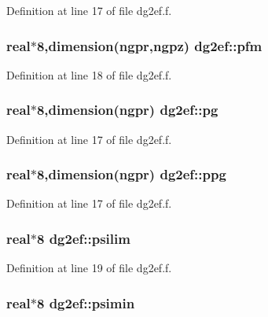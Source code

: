 Definition at line 17 of file dg2ef.f.\hypertarget{namespacedg2ef_b6b952ebcf59b377d1bca5197bf5500e}{
\subsubsection[pfm]{\setlength{\rightskip}{0pt plus 5cm}real$\ast$8,dimension(ngpr,ngpz) {\bf dg2ef::pfm}}}
\label{namespacedg2ef_b6b952ebcf59b377d1bca5197bf5500e}




Definition at line 18 of file dg2ef.f.\hypertarget{namespacedg2ef_02f0b7a326715f2d470ae58927ae092f}{
\subsubsection[pg]{\setlength{\rightskip}{0pt plus 5cm}real$\ast$8,dimension(ngpr) {\bf dg2ef::pg}}}
\label{namespacedg2ef_02f0b7a326715f2d470ae58927ae092f}




Definition at line 17 of file dg2ef.f.\hypertarget{namespacedg2ef_7884246d0a57fda70cd86e66469a5261}{
\subsubsection[ppg]{\setlength{\rightskip}{0pt plus 5cm}real$\ast$8,dimension(ngpr) {\bf dg2ef::ppg}}}
\label{namespacedg2ef_7884246d0a57fda70cd86e66469a5261}




Definition at line 17 of file dg2ef.f.\hypertarget{namespacedg2ef_8ecc78d90fccb117859adfeb3ecc82dc}{
\subsubsection[psilim]{\setlength{\rightskip}{0pt plus 5cm}real$\ast$8 {\bf dg2ef::psilim}}}
\label{namespacedg2ef_8ecc78d90fccb117859adfeb3ecc82dc}




Definition at line 19 of file dg2ef.f.\hypertarget{namespacedg2ef_ec5353711f40c34c79b48eaf14c7b436}{
\subsubsection[psimin]{\setlength{\rightskip}{0pt plus 5cm}real$\ast$8 {\bf dg2ef::psimin}}}
\label{namespacedg2ef_ec5353711f40c34c79b48eaf14c7b436}




